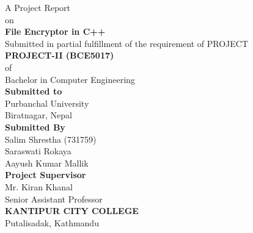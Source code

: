 \documentclass[12pt, a4paper]{report}
\begin{document}
\begin{titlepage}
  \centering
  \vspace*{1.5cm}

  {\large A Project Report}\\[0.4cm]
  {\large on}\\[0.6cm]
  {\LARGE \textbf{File Encryptor in C++}}\\[2cm]

  {\normalsize Submitted in partial fulfillment of the requirement of PROJECT}\\[0.2cm]
  {\normalsize \textbf{PROJECT-II (BCE5017)}}\\[0.2cm]
  {\normalsize of}\\[0.2cm]
  {\normalsize Bachelor in Computer Engineering}\\[2cm]

  {\large \textbf{Submitted to}}\\[0.6cm]


  {\large Purbanchal University}\\[0.2cm]
  {\large Biratnagar, Nepal}\\[2cm]

  {\large \textbf{Submitted By}}\\[0.4cm]
  Salim Shrestha (731759)\\[0.1cm]
  Saraswati Rokaya\\[0.1cm]
  Aayush Kumar Mallik\\[2cm]

  {\large \textbf{Project Supervisor}}\\[0.4cm]
  Mr. Kiran Khanal\\
  Senior Assistant Professor\\[1.5cm]

  {\large \textbf{KANTIPUR CITY COLLEGE}}\\
  Putalisadak, Kathmandu

\end{titlepage}

\setcounter{page}{2}           %
\onehalfspacing
\end{document}
